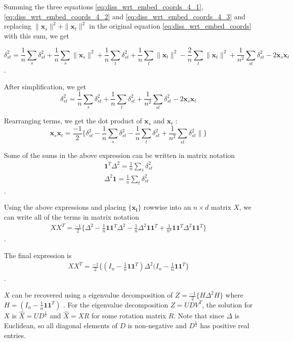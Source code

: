 \documentclass[12pt,oneside,final]{thesis}\usepackage[]{graphicx}\usepackage[]{color}
\begin{document}
Summing the three equations 
\eqref{eq:diss_wrt_embed_coords_4_1}, \eqref{eq:diss_wrt_embed_coords_4_2}  and  \eqref{eq:diss_wrt_embed_coords_4_3} and replacing   $\|\bm{x}_{s}   \|^2 +\|\bm{x}_{t}\|^2$  in the original equation \eqref{eq:diss_wrt_embed_coords} with this sum, we get 

\[
\delta_{st}^2= \frac{1}{n}\sum_s{ \delta_{st}^2} + \frac{1}{n}\sum_s{\|\bm{x}_{s}}   \|^2 + \frac{1}{n}\sum_t{ \delta_{st}^2} + \frac{1}{n}\sum_t{\|\bm{x}_{t}}  \|^2  -\frac{2}{n}\sum_{t}{\|\bm{x}_{t}   \|^2} +\frac{1}{n^2}\sum_{st}{ \delta_{st}^2}   -2\bm{x}_{s}   \bm{x}_{t}  
\].

After simplification, we get
\[
\delta_{st}^2= \frac{1}{n}\sum_s{ \delta_{st}^2} +  \frac{1}{n}\sum_t{ \delta_{st}^2}  +\frac{1}{n^2}\sum_{st}{ \delta_{st}^2}  -2\bm{x}_{s}   \bm{x}_{t}   
\]

Rearranging terms, we get the dot product of $\bm{x}_{s}$ and $\bm{x}_{t}$ :
\[
\bm{x}_{s}   \bm{x}_{t} = \frac{-1}{2} \{\delta_{st}^2 - \frac{1}{n}\sum_s{ \delta_{st}^2} -  \frac{1}{n}\sum_t{ \delta_{st}^2}  +\frac{1}{n^2}\sum_{st}{ \delta_{st}^2 }     \| \}
\]



Some of the sums in the above expression can be written in matrix notation
\begin{align*}
\bm{1}^{T}\Delta^2= \frac{1}{n}\sum_s{ \delta_{st}^2}\\
\Delta^2 \bm{1} = \frac{1}{n}\sum_t{ \delta_{st}^2}
\end{align*}.

Using the above expressions and placing $\{\bm{x_i}\}$ rowwise into an $n \times d$ matrix $X$, we can write all of the terms in matrix notation
\begin{align*}
XX^T = \frac{-1}{2} \{\Delta^2 -  \frac{1}{n} \bm{1}\bm{1}^{T}\Delta^2  -  \frac{1}{n} \Delta^2 \bm{1}\bm{1}^{T} +   \frac{1}{n^2} \bm{1}\bm{1}^{T}\Delta^2 \bm{1}\bm{1}^{T}      \}
\end{align*}.

The final expression is 
\begin{align*}
XX^T = \frac{-1}{2} \{(I_n- \frac{1}{n}\bm{1}\bm{1}^{T})\Delta^2 (I_n- \frac{1}{n}\bm{1}\bm{1}^{T} \} 
\end{align*}.

$X$ can be recovered using a eigenvalue decomposition of $Z=\frac{-1}{2} \{ H \Delta^2 H\} $ where $H= (I_n- \frac{1}{n}\bm{1}\bm{1}^{T})$ . For the eigenvalue decomposition $Z=UDV^T$, the solution for $X$ is $\hat{X}=UD^{\frac{1}{2}}$ and  $\hat{X}=XR$ for some rotation matrix $R$. Note that since  $\Delta$ is Euclidean, so  all diagonal elements of $D$ is non-negative and $D^{\frac{1}{2}}$ has positive real entries. 
\end{document}
